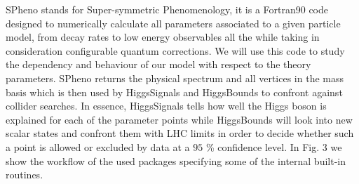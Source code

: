 \documentclass[12pt]{article}
\begin{document}
SPheno stands for Super-symmetric Phenomenology, it is a Fortran90 code designed to numerically calculate all parameters associated to a given particle model, from decay rates to low energy observables all the while taking in consideration configurable quantum corrections. 
%
We will use this code to study the dependency and behaviour of our model with respect to the theory parameters. 
SPheno returns the physical spectrum and all vertices in the mass basis which is then used by HiggsSignals and HiggsBounds to confront against collider searches. In essence, HiggsSignals tells how well the Higgs boson is explained for each of the parameter points while HiggsBounds will look into new scalar states and confront them with LHC limits in order to decide whether such a point is allowed or excluded by data at a $95$ \% confidence level. In Fig. 3 we show the workflow of the used packages specifying some of the internal built-in routines. \cite{porod2003spheno} \cite{porod2012spheno} \cite{vicente2015computer} \cite{staub2012tool}
\end{document}
